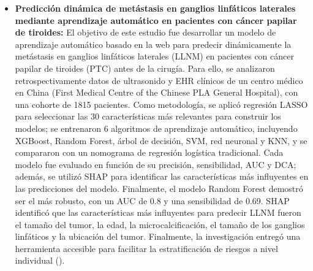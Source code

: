 \begin{itemize}
\item \textbf{Predicción dinámica de metástasis en ganglios linfáticos laterales mediante aprendizaje automático en pacientes con cáncer papilar de tiroides:} El objetivo de este estudio fue desarrollar un modelo de aprendizaje automático basado en la web para predecir dinámicamente la metástasis en ganglios linfáticos laterales (LLNM) en pacientes con cáncer papilar de tiroides (PTC) antes de la cirugía. Para ello, se analizaron retrospectivamente datos de ultrasonido y EHR clínicos de un centro médico en China (First Medical Centre of the Chinese PLA General Hospital), con una cohorte de 1815 pacientes. Como metodología, se aplicó regresión LASSO para seleccionar las 30 características más relevantes para construir los modelos; se entrenaron 6 algoritmos de aprendizaje automático, incluyendo XGBoost, Random Forest, árbol de decisión, SVM, red neuronal y KNN, y se compararon con un nomograma de regresión logística tradicional. Cada modelo fue evaluado en función de su precisión, sensibilidad, AUC y DCA; además, se utilizó SHAP para identificar las características más influyentes en las predicciones del modelo. Finalmente, el modelo Random Forest demostró ser el más robusto, con un AUC de 0.8 y una sensibilidad de 0.69. SHAP identificó que las características más influyentes para predecir LLNM fueron el tamaño del tumor, la edad, la microcalcificación, el tamaño de los ganglios linfáticos y la ubicación del tumor. Finalmente, la investigación entregó una herramienta accesible para facilitar la estratificación de riesgos a nivel individual (\cite{article4}).

\end{itemize}
